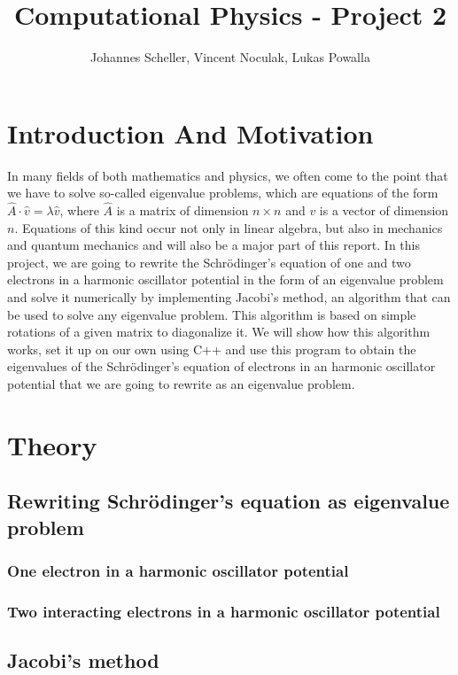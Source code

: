\documentclass[10pt,a4paper]{article}
\author{Johannes Scheller, Vincent Noculak, Lukas Powalla}
\title{Computational Physics - Project 2}
\begin{document}
\maketitle
\newpage
\tableofcontents
\newpage
\section{Introduction And Motivation}
In many fields of both mathematics and physics, we often come to the point that we have to solve so-called eigenvalue problems, which are equations of the form $\hat{A}\cdot\hat{v}=\lambda\hat{v}$, where $\hat{A}$ is a matrix of dimension $n\times n$ and $v$ is a vector of dimension $n$. Equations of this kind occur not only in linear algebra, but also in mechanics and quantum mechanics and will also be a major part of this report. In this project, we are going to rewrite the Schrödinger's equation of one and two electrons in a harmonic oscillator potential in the form of an eigenvalue problem and solve it numerically by implementing Jacobi's method, an algorithm that can be used to solve any eigenvalue problem. This algorithm is based on simple rotations of a given matrix to diagonalize it. We will show how this algorithm works, set it up on our own using C++ and use this program to obtain the eigenvalues of the Schrödinger's equation of electrons in an harmonic oscillator potential that we are going to rewrite as an eigenvalue problem.

\section{Theory}
\subsection{Rewriting Schrödinger's equation as eigenvalue problem}
\subsubsection{One electron in a harmonic oscillator potential}
\subsubsection{Two interacting electrons in a harmonic oscillator potential}
\subsection{Jacobi's method}
\end{document}
